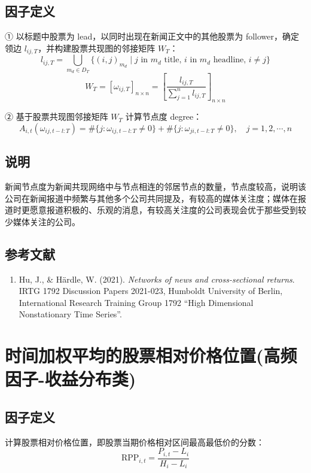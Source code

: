 \documentclass{article}
\begin{document}
\subsection{因子定义}
① 以标题中股票为 lead，以同时出现在新闻正文中的其他股票为 follower，确定领边 \( l_{ij,T} \)，并构建股票共现图的邻接矩阵 \( W_T \)：
\begin{equation}
    l_{ij,T} = \bigcup_{m_d \in D_T} \{(i,j)_{m_d} \mid j \text{ in } m_d \text{ title, } i \text{ in } m_d \text{ headline, } i \neq j\}
\end{equation}
\begin{equation}
    W_T = [\omega_{ij,T}]_{n \times n} = \left[ \frac{l_{ij,T}}{\sum_{j=1}^n l_{ij,T}} \right]_{n \times n}
\end{equation}

② 基于股票共现图邻接矩阵 \( W_T \) 计算节点度 degree：
\begin{equation}
    A_{i,t}(\omega_{ij,t-l:T}) = \# \{j : \omega_{ij,t-l:T} \neq 0\} + \# \{j : \omega_{ji,t-l:T} \neq 0\}, \quad j = 1, 2, \cdots, n
\end{equation}

\subsection{说明}
新闻节点度为新闻共现网络中与节点相连的邻居节点的数量，节点度较高，说明该公司在新闻报道中频繁与其他多个公司共同提及，有较高的媒体关注度；媒体在报道时更愿意报道积极的、乐观的消息，有较高关注度的公司表现会优于那些受到较少媒体关注的公司。

\subsection{参考文献}
\begin{enumerate}
    \item Hu, J., \& Härdle, W. (2021). \textit{Networks of news and cross-sectional returns}. IRTG 1792 Discussion Papers 2021-023, Humboldt University of Berlin, International Research Training Group 1792 “High Dimensional Nonstationary Time Series”.
\end{enumerate}

\section{时间加权平均的股票相对价格位置(高频因子-收益分布类)}

\subsection{因子定义}
计算股票相对价格位置，即股票当期价格相对区间最高最低价的分数：
\begin{equation}
    \mathrm{RPP}_{i,t} = \frac{P_{i,t} - L_i}{H_i - L_i}
\end{equation}
\end{document}
